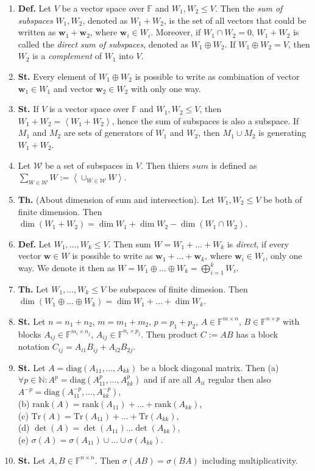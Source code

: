 \documentclass{article}
\newcommand{\<}{\left<}
\renewcommand{\>}{\right>}
\newcommand{\rank}{\text{rank}}
\newcommand{\Tr}{\text{Tr}}
\newcommand{\diag}{\text{diag}}
\newcommand{\N}{\mathbb{N}}
\newcommand{\F}{\mathbb{F}}
\newcommand{\define}{\textbf{Def. }}
\newcommand{\state}{\textbf{St. }}
\newcommand{\theor}{\textbf{Th. }}
\begin{document}
\begin{multicols}{3}
\begin{enumerate}[itemsep=2pt, topsep=2pt, partopsep=2pt, parsep=2pt]
        \item \define Let $V$ be a vector space over $\F$ and $W_1,W_2\leq V$. Then the \emph{sum of subspaces} $W_1,W_2$, denoted as $W_1+W_2$, is the set of all vectors that could be written as $\bm w_1+\bm w_2$, where $\bm w_i\in W_i$. Moreover, if $W_1\cap W_2=0$, $W_1+W_2$ is called the \emph{direct sum of subspaces}, denoted as $W_1\oplus W_2$. If $W_1\oplus W_2=V$, then $W_2$ is a \emph{complement} of $W_1$ into $V$.
        \item \state Every element of $W_1\oplus W_2$ is possible to write as combination of vector $\bm w_1\in W_1$ and vector $\bm w_2\in W_2$ with only one way.
        \item \state If $V$ is a vector space over $\F$ and $W_1,W_2\leq V$, then $W_1+W_2=\<W_1+W_2\>$, hence the sum of subspaces is also a subspace. If $M_1$ and $M_2$ are sets of generators of $W_1$ and $W_2$, then $M_1\cup M_2$ is generating $W_1+W_2$.
        \item Let $\mathcal W$ be a set of subspaces in $V$. Then thiers $sum$ is defined as $\sum_{W\in\mathcal W}W:=\<\cup_{W\in\mathcal W}W\>$.
        \item \theor (About dimension of sum and intersection). Let $W_1,W_2\leq V$ be both of finite dimension. Then $\dim(W_1+W_2)=\dim W_1+\dim W_2-\dim(W_1\cap W_2)$.
        \item \define Let $W_1,\ldots,W_k\leq V$. Then sum $W=W_1+\ldots+W_k$ is \emph{direct}, if every  vector $\bm w\in W$ is possible to write as $\bm w_1+\ldots+\bm w_k$, where $\bm w_i\in W_i$, only one way. We denote it then as $W=W_1\oplus\ldots\oplus W_k=\bigoplus_{i=1}^kW_i$.
        \item \theor Let $W_1,\ldots,W_k\leq V$ be subspaces of finite dimesion. Then $\dim(W_1\oplus\ldots\oplus W_k)=\dim W_1+\ldots+\dim W_k$.
        \item \state Let $n=n_1+n_2$, $m=m_1+m_2$, $p=p_1+p_2$, $A\in\F^{m\times n}$, $B\in\F^{n\times p}$ with blocks $A_{ij}\in\F^{m_i\times n_j}$, $A_{ij}\in\F^{n_i\times p_j}$. Then product $C:=AB$ has a block notation $C_{ij}=A_{i1}B_{ij}+A_{i2}B_{2j}$.
        \item \state Let $A=\diag(A_{11},\ldots,A_{kk})$ be a block diagonal matrix. Then (a) $\forall p\in\N:A^p=\diag(A^p_{11},\ldots,A^p_{kk})$ and if are all $A_{ii}$ regular then also $A^{-p}=\diag(A^{-p}_{11},\ldots,A^{-p}_{kk})$, \\(b) $\rank(A)=\rank(A_{11})+\ldots+\rank(A_{kk})$,\\
        (c) $\Tr(A)=\Tr(A_{11})+\ldots+\Tr(A_{kk})$,\\
        (d) $\det(A)=\det(A_{11})\ldots\det(A_{kk})$,\\
        (e) $\sigma(A)=\sigma(A_{11})\cup\ldots\cup\sigma(A_{kk})$.
        \item \state Let $A,B\in\F^{n\times n}$. Then $\sigma(AB)=\sigma(BA)$ including multiplicativity.


\end{enumerate}
\end{multicols}
\end{document}
